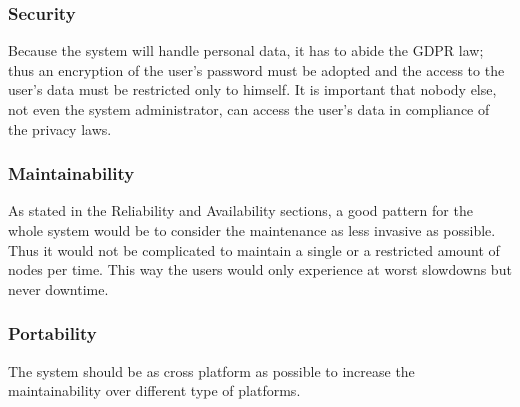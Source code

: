 \subsubsection{Security}
Because the system will handle personal data, it has to abide the \ac{GDPR} law; thus an encryption of the user's password must be adopted and the access to the user's data must be restricted only to himself.
It is important that nobody else, not even the system administrator, can access the user's data in compliance of the privacy laws.\\
\subsubsection{Maintainability}
As stated in the Reliability and Availability sections, a good pattern for the whole system would be to consider the maintenance as less invasive as possible. Thus it would not be complicated to maintain a single or a restricted amount of nodes per time. This way the users would only experience at worst slowdowns but never downtime.
\subsubsection{Portability}
The system should be as cross platform as possible to increase the maintainability over different type of platforms.
\clearpage